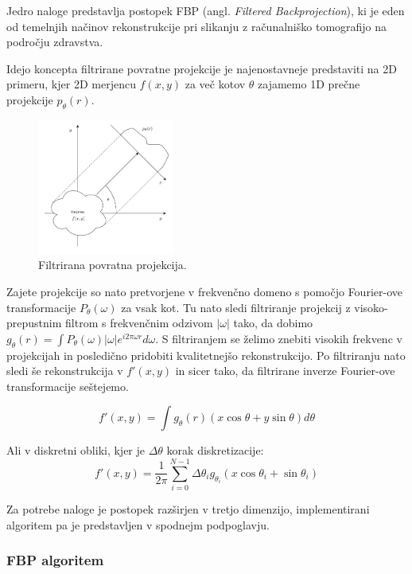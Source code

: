 \documentclass[journal,a4paper,twoside]{sty/IEEEtran}
\begin{document}
Jedro naloge predstavlja postopek FBP (angl. \textit{Filtered Backprojection}), ki je eden od temelnjih načinov rekonstrukcije pri slikanju z računalniško tomografijo na področju zdravstva.

Idejo koncepta filtrirane povratne projekcije je najenostavneje predstaviti na 2D primeru, kjer 2D merjencu $f(x,y)$ za več kotov $\theta$ zajamemo 1D prečne projekcije $p_{\theta}(r)$.

\begin{figure}[H]
	\centerline{\includegraphics[width=4.5cm]{fig/FBPderi}}
	\caption{Filtrirana povratna projekcija.}
	\label{fig:fbp_deri}
\end{figure}

Zajete projekcije so nato pretvorjene v frekvenčno domeno s pomočjo Fourier-ove transformacije $P_{\theta}(\omega)$ za vsak kot. Tu nato sledi filtriranje projekcij z visoko-prepustnim filtrom s frekvenčnim odzivom $|\omega|$ tako, da dobimo $g_{\theta}(r) = \int  P_{\theta}(\omega)|\omega|e^{i 2\pi\omega r} d\omega$. S filtriranjem se želimo znebiti visokih frekvenc v projekcijah in posledično pridobiti kvalitetnejšo rekonstrukcijo. Po filtriranju nato sledi še rekonstrukcija v $f'(x,y)$ in sicer tako, da filtrirane inverze Fourier-ove transformacije seštejemo.

\begin{equation}
f'(x,y) = \int g_{\theta}(r) (x \cos\theta + y \sin \theta)d\theta
\end{equation}

Ali v diskretni obliki, kjer je $\Delta\theta$ korak diskretizacije:
\begin{equation}
f'(x,y) = \frac{1}{2\pi} \sum\limits_{i=0}^{N-1} \Delta\theta_i g_{\theta_i}(x \cos\theta_i + \sin\theta_i)
\end{equation}

Za potrebe naloge je postopek razširjen v tretjo dimenzijo, implementirani algoritem pa je predstavljen v spodnejm podpoglavju.

\subsubsection{FBP algoritem}
\end{document}
